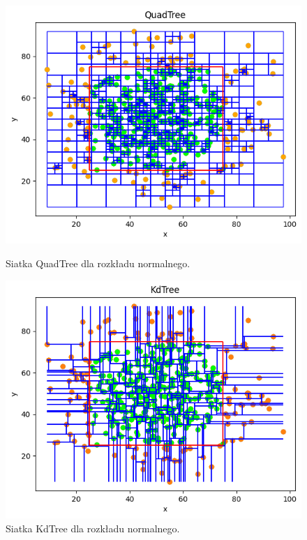 \documentclass{lab}
\begin{document}
\begin{figure}[H]
  \centering
  \begin{minipage}{0.495\textwidth}
      \centering
      \includegraphics[width=1\textwidth]{resources/normal_QuadTree.png}
      \caption{Siatka QuadTree dla rozkładu normalnego.}
      \label{fig:normal_QuadTree}
  \end{minipage}
  \begin{minipage}{0.495\textwidth}
      \centering
      \includegraphics[width=1\textwidth]{resources/normal_KdTree.png}
      \caption{Siatka KdTree dla rozkładu normalnego.}
      \label{fig:normal_KdTree}
  \end{minipage}
\end{figure}
\end{document}
